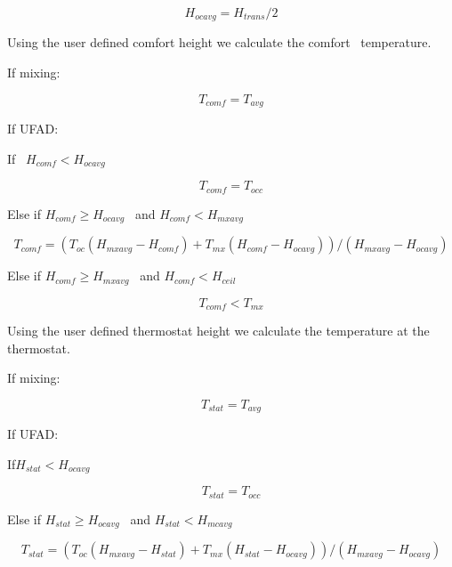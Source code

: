 \begin{equation}
{H_{ocavg}} = {H_{trans}}/2
\end{equation}

Using the user defined comfort height we calculate the comfort~ temperature.

If mixing:

\begin{equation}
{T_{comf}} = {T_{avg}}
\end{equation}

If UFAD:

If~ \({H_{comf}} < {H_{ocavg}}\)

\begin{equation}
{T_{comf}} = {T_{occ}}
\end{equation}

Else if \({H_{comf}} \ge {H_{ocavg}}\) ~and \({H_{comf}} < {H_{mxavg}}\)

\begin{equation}
{T_{comf}} = \left( {{T_{oc}}\left( {{H_{mxavg}} - {H_{comf}}} \right) + {T_{mx}}\left( {{H_{comf}} - {H_{ocavg}}} \right)} \right)/\left( {{H_{mxavg}} - {H_{ocavg}}} \right)
\end{equation}

Else if \({H_{comf}} \ge {H_{mxavg}}\) ~and \({H_{comf}} < {H_{ceil}}\)

\begin{equation}
{T_{comf}} < {T_{mx}}
\end{equation}

Using the user defined thermostat height we calculate the temperature at the thermostat.

If mixing:

\begin{equation}
{T_{stat}} = {T_{avg}}
\end{equation}

If UFAD:

If\({H_{stat}} < {H_{ocavg}}\)

\begin{equation}
{T_{stat}} = {T_{occ}}
\end{equation}

Else if \({H_{stat}} \ge {H_{ocavg}}\) ~and \({H_{stat}} < {H_{mcavg}}\)

\begin{equation}
{T_{stat}} = \left( {{T_{oc}}\left( {{H_{mxavg}} - {H_{stat}}} \right) + {T_{mx}}\left( {{H_{stat}} - {H_{ocavg}}} \right)} \right)/\left( {{H_{mxavg}} - {H_{ocavg}}} \right)
\end{equation}

